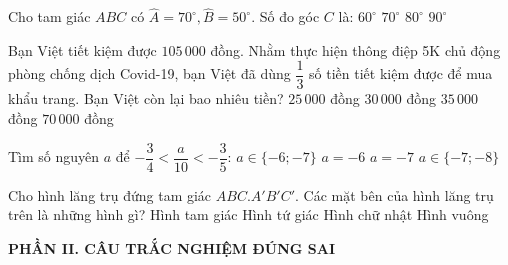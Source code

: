 \documentclass[12pt,a4paper]{article}
\begin{document}
\begin{ex}
Cho tam giác $ABC$ có $\widehat{A} = 70^\circ, \widehat{B} = 50^\circ$. Số đo góc $C$ là:
\choice
{\True $60^\circ$}
{$70^\circ$}
{$80^\circ$}
{$90^\circ$}
\end{ex}

\begin{ex}
Bạn Việt tiết kiệm được $105\,000$ đồng. Nhằm thực hiện thông điệp 5K chủ động phòng chống dịch Covid-19, bạn Việt đã dùng $\dfrac{1}{3}$ số tiền tiết kiệm được để mua khẩu trang. Bạn Việt còn lại bao nhiêu tiền?
\choice
{$25\,000$ đồng}
{$30\,000$ đồng}
{$35\,000$ đồng}
{\True $70\,000$ đồng}
\end{ex}

\begin{ex}
Tìm số nguyên $a$ để $-\dfrac{3}{4} < \dfrac{a}{10} < -\dfrac{3}{5}$:
\choice
{$a \in \{-6; -7\}$}
{$a = -6$}
{\True $a = -7$}
{$a \in \{-7; -8\}$}
\end{ex}

\begin{ex}
Cho hình lăng trụ đứng tam giác $ABC.A'B'C'$. Các mặt bên của hình lăng trụ trên là những hình gì?
\choice
{Hình tam giác}
{Hình tứ giác}
{\True Hình chữ nhật}
{Hình vuông}
\end{ex}


\setcounter{ex}{0}
\noindent\textbf{\large PHẦN II. CÂU TRẮC NGHIỆM ĐÚNG SAI}
\end{document}
